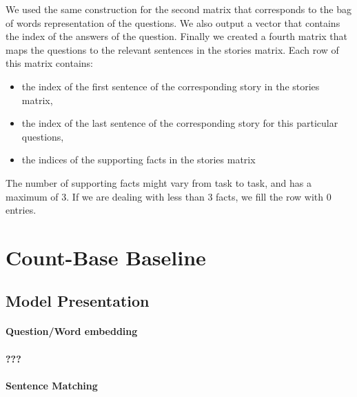 \documentclass[paper=a4, fontsize=11pt]{scrartcl} %
\numberwithin{equation}{section} %
\numberwithin{figure}{section} %
\numberwithin{table}{section} %
\begin{document}
We used the same construction for the second matrix that corresponds to the bag of words representation of the questions. We also output a vector that contains the index of the answers of the question. Finally we created a fourth matrix that maps the questions to the relevant sentences in the stories matrix. Each row of this matrix contains:

\begin{itemize}
\item the index of the first sentence of the corresponding story in the stories matrix,
\item the index of the last sentence of the corresponding story for this particular questions, 
\item the indices of the supporting facts in the stories matrix
\end{itemize}
The number of supporting facts might vary from task to task, and has a maximum of 3. If we are dealing with less than 3 facts, we fill the row with 0 entries.

\section{Count-Base Baseline}
\subsection{Model Presentation}

\paragraph{Question/Word embedding}
\paragraph{???}
\paragraph{Sentence Matching}
\end{document}
